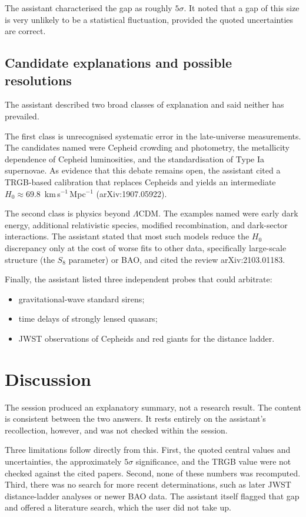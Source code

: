 \documentclass[11pt,a4paper]{article}
\begin{document}
The assistant characterised the gap as roughly $5\sigma$. It noted that a gap of this size is very unlikely to be a statistical fluctuation, provided the quoted uncertainties are correct.

\subsection{Candidate explanations and possible resolutions}
The assistant described two broad classes of explanation and said neither has prevailed.

The first class is unrecognised systematic error in the late-universe measurements. The candidates named were Cepheid crowding and photometry, the metallicity dependence of Cepheid luminosities, and the standardisation of Type Ia supernovae. As evidence that this debate remains open, the assistant cited a TRGB-based calibration that replaces Cepheids and yields an intermediate $H_0 \approx 69.8$~km\,s$^{-1}$\,Mpc$^{-1}$ (arXiv:1907.05922).

The second class is physics beyond $\Lambda$CDM. The examples named were early dark energy, additional relativistic species, modified recombination, and dark-sector interactions. The assistant stated that most such models reduce the $H_0$ discrepancy only at the cost of worse fits to other data, specifically large-scale structure (the $S_8$ parameter) or BAO, and cited the review arXiv:2103.01183.

Finally, the assistant listed three independent probes that could arbitrate:
\begin{itemize}
\item gravitational-wave standard sirens;
\item time delays of strongly lensed quasars;
\item JWST observations of Cepheids and red giants for the distance ladder.
\end{itemize}

\section{Discussion}
The session produced an explanatory summary, not a research result. The content is consistent between the two answers. It rests entirely on the assistant's recollection, however, and was not checked within the session.

Three limitations follow directly from this. First, the quoted central values and uncertainties, the approximately $5\sigma$ significance, and the TRGB value were not checked against the cited papers. Second, none of these numbers was recomputed. Third, there was no search for more recent determinations, such as later JWST distance-ladder analyses or newer BAO data. The assistant itself flagged that gap and offered a literature search, which the user did not take up.
\end{document}
